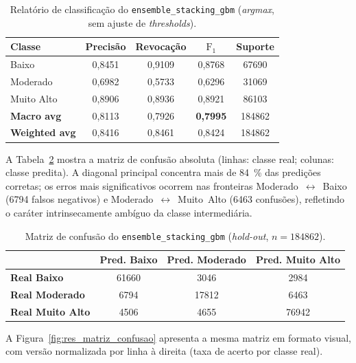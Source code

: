 \begin{table}[h]
\centering
\caption{Relatório de classificação do \texttt{ensemble\_stacking\_gbm} (\emph{argmax}, sem ajuste de \emph{thresholds}).}
\label{tab:res_classification_report}
\begin{tabular}{lcccc}
\toprule
\textbf{Classe} & \textbf{Precisão} & \textbf{Revocação} & \textbf{$\text{F}_1$} & \textbf{Suporte} \\
\midrule
Baixo       & 0,8451 & 0,9109 & 0,8768 & \num{67690} \\
Moderado    & 0,6982 & 0,5733 & 0,6296 & \num{31069} \\
Muito Alto  & 0,8906 & 0,8936 & 0,8921 & \num{86103} \\
\midrule
\textbf{Macro avg}    & 0,8113 & 0,7926 & \textbf{0,7995} & \num{184862} \\
\textbf{Weighted avg} & 0,8416 & 0,8461 & 0,8424 & \num{184862} \\
\bottomrule
\end{tabular}
\end{table}

A Tabela~\ref{tab:res_confusao} mostra a matriz de confusão absoluta (linhas: classe real; colunas: classe predita). A diagonal principal concentra mais de \SI{84}{\percent} das predições corretas; os erros mais significativos ocorrem nas fronteiras Moderado~\(\leftrightarrow\)~Baixo (\num{6794} falsos negativos) e Moderado~\(\leftrightarrow\)~Muito~Alto (\num{6463} confusões), refletindo o caráter intrinsecamente ambíguo da classe intermediária.

\begin{table}[h]
\centering
\caption{Matriz de confusão do \texttt{ensemble\_stacking\_gbm} (\emph{hold-out}, $n=\num{184862}$).}
\label{tab:res_confusao}
\begin{tabular}{lccc}
\toprule
& \textbf{Pred. Baixo} & \textbf{Pred. Moderado} & \textbf{Pred. Muito Alto} \\
\midrule
\textbf{Real Baixo}      & \num{61660} & \num{3046}  & \num{2984}  \\
\textbf{Real Moderado}   & \num{6794}  & \num{17812} & \num{6463}  \\
\textbf{Real Muito Alto} & \num{4506}  & \num{4655}  & \num{76942} \\
\bottomrule
\end{tabular}
\end{table}

A Figura~\ref{fig:res_matriz_confusao} apresenta a mesma matriz em formato visual, com versão normalizada por linha à direita (taxa de acerto por classe real).

